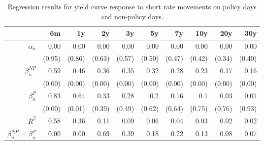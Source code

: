\begin{table}[ht]
\centering
\caption{Regression results for yield curve response to short rate movements on policy days and non-policy days.} 
\label{tab:NPvsPdays}
\begingroup\small
\begin{tabular}{rrrrrrrrrr}
  \toprule
  & 6m & 1y & 2y & 3y & 5y & 7y & 10y & 20y & 30y \\ 
  \midrule
$\alpha_n$ & 0.00 & 0.00 & 0.00 & 0.00 & 0.00 & 0.00 & 0.00 & 0.00 & 0.00 \\ 
   & (0.95) & (0.86) & (0.63) & (0.57) & (0.50) & (0.47) & (0.42) & (0.34) & (0.40) \\ 
  $\beta_n^{NP}$ & 0.59 & 0.46 & 0.36 & 0.35 & 0.32 & 0.28 & 0.23 & 0.17 & 0.16 \\ 
   & (0.00) & (0.00) & (0.00) & (0.00) & (0.00) & (0.00) & (0.00) & (0.00) & (0.00) \\ 
  $\beta_n^P$ & 0.83 & 0.64 & 0.33 & 0.28 & 0.2 & 0.16 & 0.1 & 0.03 & 0.01 \\ 
   & (0.00) & (0.01) & (0.39) & (0.49) & (0.62) & (0.64) & (0.75) & (0.76) & (0.93) \\ 
  $\bar{R}^2$ & 0.58 & 0.36 & 0.11 & 0.09 & 0.06 & 0.04 & 0.03 & 0.02 & 0.02 \\ 
  $\beta_n^{NP}$ = $\beta_n^P$ & 0.00 & 0.00 & 0.69 & 0.39 & 0.18 & 0.22 & 0.13 & 0.08 & 0.07 \\ 
   \bottomrule
\end{tabular}
\endgroup
\end{table}
